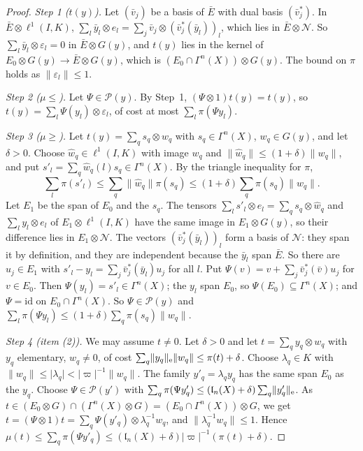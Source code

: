 \documentclass[11pt]{amsart}
\theoremstyle{definition}
\theoremstyle{remark}
\numberwithin{equation}{section}
\newcommand{\id}{\mathrm{id}}
\newcommand{\abs}[1]{\lvert #1\rvert}
\newcommand{\norm}[1]{\lVert #1\rVert}
\theoremstyle{plain}
\theoremstyle{definition}
\theoremstyle{plain}
\begin{document}
\begin{proof}
\emph{Step 1 ($t(y)$).} Let $(\bar v_j)$ be a basis of $\bar E$ with dual basis $(\bar v_j^*)$. In $\bar E\otimes\ell^1(I,K)$, $\sum_l\bar y_l\otimes e_l=\sum_j\bar v_j\otimes(\bar v_j^*(\bar y_l))_l$, which lies in $\bar E\otimes\mathcal N$. So $\sum_l\bar y_l\otimes\varepsilon_l=0$ in $\bar E\otimes G(y)$, and $t(y)$ lies in the kernel of $E_0\otimes G(y)\to\bar E\otimes G(y)$, which is $(E_0\cap\Gamma^n(X))\otimes G(y)$. The bound on $\pi$ holds as $\norm{\varepsilon_l}\le1$.

\emph{Step 2 ($\mu\le$).} Let $\Psi\in\mathcal P(y)$. By Step~1, $(\Psi\otimes1)t(y)=t(y)$, so $t(y)=\sum_l\Psi(y_l)\otimes\varepsilon_l$, of cost at most $\sum_l\pi(\Psi y_l)$.

\emph{Step 3 ($\mu\ge$).} Let $t(y)=\sum_qs_q\otimes w_q$ with $s_q\in\Gamma^n(X)$, $w_q\in G(y)$, and let $\delta>0$. Choose $\hat w_q\in\ell^1(I,K)$ with image $w_q$ and $\norm{\hat w_q}\le(1+\delta)\norm{w_q}$, and put $s'_l=\sum_q\hat w_q(l)s_q\in\Gamma^n(X)$. By the triangle inequality for $\pi$,
\[
 \sum_l\pi(s'_l)\le\sum_q\norm{\hat w_q}\pi(s_q)\le(1+\delta)\sum_q\pi(s_q)\norm{w_q}.
\]
Let $E_1$ be the span of $E_0$ and the $s_q$. The tensors $\sum_ls'_l\otimes e_l=\sum_qs_q\otimes\hat w_q$ and $\sum_ly_l\otimes e_l$ of $E_1\otimes\ell^1(I,K)$ have the same image in $E_1\otimes G(y)$, so their difference lies in $E_1\otimes\mathcal N$. The vectors $(\bar v_j^*(\bar y_l))_l$ form a basis of $\mathcal N$: they span it by definition, and they are independent because the $\bar y_l$ span $\bar E$. So there are $u_j\in E_1$ with $s'_l-y_l=\sum_j\bar v_j^*(\bar y_l)u_j$ for all $l$. Put $\Psi(v)=v+\sum_j\bar v_j^*(\bar v)u_j$ for $v\in E_0$. Then $\Psi(y_l)=s'_l\in\Gamma^n(X)$; the $y_l$ span $E_0$, so $\Psi(E_0)\subseteq\Gamma^n(X)$; and $\Psi=\id$ on $E_0\cap\Gamma^n(X)$. So $\Psi\in\mathcal P(y)$ and $\sum_l\pi(\Psi y_l)\le(1+\delta)\sum_q\pi(s_q)\norm{w_q}$.

\emph{Step 4 (item (2)).} We may assume $t\ne0$. Let $\delta>0$ and let $t=\sum_qy_q\otimes w_q$ with $y_q$ elementary, $w_q\ne0$, of cost $\sum_q\norm{y_q}_{\rm e}\norm{w_q}\le\pi(t)+\delta$. Choose $\lambda_q\in K$ with $\norm{w_q}\le\abs{\lambda_q}<\abs\varpi^{-1}\norm{w_q}$. The family $y'_q=\lambda_qy_q$ has the same span $E_0$ as the $y_q$. Choose $\Psi\in\mathcal P(y')$ with $\sum_q\pi(\Psi y'_q)\le(\mathfrak l_n(X)+\delta)\sum_q\norm{y'_q}_{\rm e}$. As $t\in(E_0\otimes G)\cap(\Gamma^n(X)\otimes G)=(E_0\cap\Gamma^n(X))\otimes G$, we get $t=(\Psi\otimes1)t=\sum_q\Psi(y'_q)\otimes\lambda_q^{-1}w_q$, and $\norm{\lambda_q^{-1}w_q}\le1$. Hence $\mu(t)\le\sum_q\pi(\Psi y'_q)\le(\mathfrak l_n(X)+\delta)\abs\varpi^{-1}(\pi(t)+\delta)$.
\end{proof}
\end{document}
